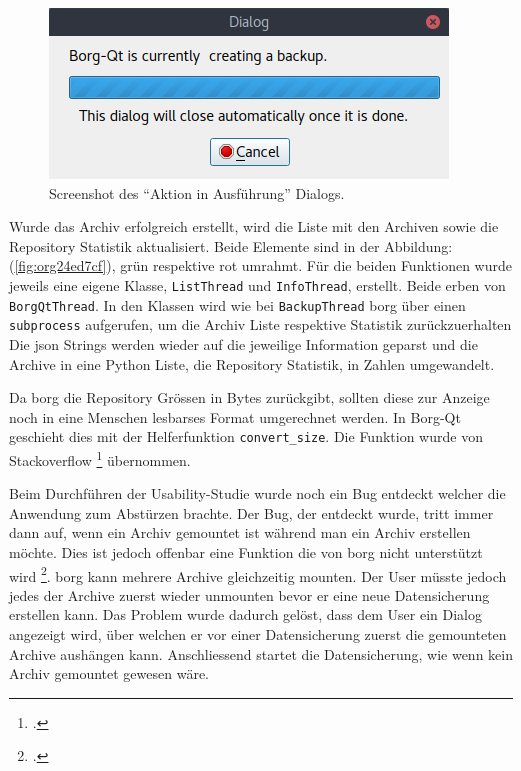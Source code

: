 \begin{figure}[H]
\centering
\includegraphics[width=.4\paperwidth]{pictures/borgqt_progress_v2.png}
\caption{\label{fig:org52ca607}
Screenshot des "`Aktion in Ausführung"' Dialogs.}
\end{figure}

Wurde das Archiv erfolgreich erstellt, wird die Liste mit den Archiven sowie
die Repository Statistik aktualisiert. Beide Elemente sind in der
Abbildung:(\ref{fig:org24ed7cf}), grün respektive rot umrahmt. Für die
beiden Funktionen wurde jeweils eine eigene Klasse, \texttt{ListThread} und
\texttt{InfoThread}, erstellt. Beide erben von \texttt{BorgQtThread}. In den Klassen wird wie
bei \texttt{BackupThread} \gls{borg} über einen \texttt{subprocess} aufgerufen, um die Archiv Liste
respektive Statistik zurückzuerhalten Die \gls{json} Strings werden wieder auf
die jeweilige Information geparst und die Archive in eine Python Liste, die
Repository Statistik, in Zahlen umgewandelt.

Da \gls{borg} die Repository Grössen in Bytes zurückgibt, sollten diese zur
Anzeige noch in eine Menschen lesbarses Format umgerechnet werden. In Borg-Qt
geschieht dies mit der Helferfunktion \texttt{convert\_size}. Die Funktion wurde von
Stackoverflow \footcite{sizeformat} übernommen.

Beim Durchführen der Usability-Studie wurde noch ein Bug entdeckt welcher die
Anwendung zum Abstürzen brachte. Der Bug, der entdeckt wurde, tritt immer dann
auf, wenn ein Archiv gemountet ist während man ein Archiv erstellen möchte.
Dies ist jedoch offenbar eine Funktion die von \gls{borg} nicht unterstützt wird
\footcite{borgmountissue}. \gls{borg} kann mehrere Archive gleichzeitig mounten.
Der User müsste jedoch jedes der Archive zuerst wieder unmounten bevor er eine
neue Datensicherung erstellen kann. Das Problem wurde dadurch gelöst, dass dem
User ein Dialog angezeigt wird, über welchen er vor einer Datensicherung zuerst
die gemounteten Archive aushängen kann. Anschliessend startet die
Datensicherung, wie wenn kein Archiv gemountet gewesen wäre.

